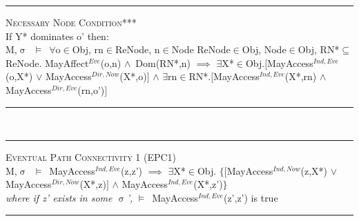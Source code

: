 \documentclass[a4paper,11pt, twoside,twocolumn]{article}
\newenvironment{logic}[1][]
{\begin{flushleft} \small }
{\end{flushleft}}
\newcommand{\loin}{$\in$}
\newcommand{\loforall}{$\forall$}
\newcommand{\loexists}{$\exists$}
\newcommand{\loand}{$\land$}
\newcommand{\loor} {$\lor$}
\newcommand{\losubseteq}{$\subseteq$}
\newcommand{\loimplies}{$\implies$}
\newcommand{\losigma}{$\upsigma$}
\newcommand{\loturns} {$\vDash$}
\newcommand{\ablock} {\null\qquad}
\begin{document}
\begin{minipage}{\linewidth}
\begin{logic}
\hrule\null
\textsc{\normalsize *Necessary Node Condition***}\\
If Y* dominates o' then:\\
M,\losigma\ \loturns\ \loforall o\loin Obj, rn\loin ReNode, n\loin Node\linebreak
ReNode\loin Obj, Node\loin Obj, RN*\losubseteq ReNode.\linebreak
\ablock MayAffect$^{Eve}$(o,n) \loand\ Dom(RN*,n)\linebreak
\ablock \loimplies\linebreak
\ablock \loexists X*\loin Obj.$[$MayAccess$^{Ind,Eve}$(o,X*)\linebreak
\ablock \ablock \ablock \ablock \quad\: \loor \linebreak
\ablock \ablock \ablock \: MayAccess$^{Dir,Now}$(X*,o)$]$\linebreak
\ablock \ablock \ablock \ablock \loand \linebreak
\ablock \ablock \loexists rn\loin{RN*}.$[$MayAccess$^{Ind,Eve}$(X*,rn) \loand\linebreak
\ablock \ablock \ablock \ablock \quad MayAccess$^{Dir,Eve}$(rn,o')$]$\linebreak\\

\hrule
\end{logic}
\end{minipage}\linebreak\\
\begin{minipage}{\linewidth}
\begin{logic}
\hrule\null
\textsc{\normalsize *Eventual Path Connectivity 1 (EPC1)}\\
M,\losigma\ \loturns\ MayAccess$^{Ind,Eve}$(z,z')\linebreak
\ablock \loimplies\linebreak
\ablock \loexists X*\loin Obj. $\{[$MayAccess$^{Ind,Now}$(z,X*)\linebreak
\ablock \ablock \ablock \ablock\loor \linebreak
\ablock \ablock \ablock \quad\: MayAccess$^{Dir,Now}$(X*,z)$]$\linebreak
\ablock \ablock \ablock \quad \loand \linebreak
\ablock \ablock \ablock \quad MayAccess$^{Ind,Eve}$(X*,z')$\}$
\\
\ablock \textit{where if z' exists in some \losigma',}\linebreak
\ablock \loturns\ MayAccess$^{Ind,Eve}$(z',z') is true
\linebreak \\
\hrule
\end{logic}
\end{minipage}
\end{document}
